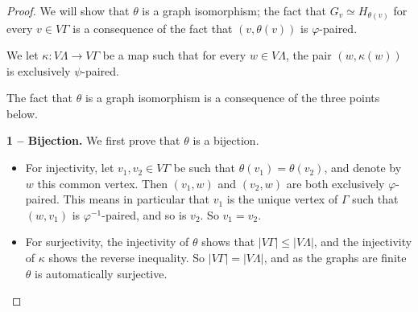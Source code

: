 \documentclass[a4paper,english,11pt]{article}
\theoremstyle{definition}
\theoremstyle{remark}
\begin{document}
\begin{proof}
We will show that $\theta$ is a graph isomorphism; the fact that $G_v\simeq H_{\theta(v)}$ for every $v\in V\Gamma$ is a consequence of the fact that $(v,\theta(v))$ is $\varphi$-paired.

We let $\kappa:V\Lambda\to V\Gamma$ be a map such that for every $w\in V\Lambda$, the pair $(w,\kappa(w))$ is exclusively $\psi$-paired. 

The fact that $\theta$ is a graph isomorphism is a consequence of the three points below. 

\medskip

\textbf{1 – Bijection.}  We first prove that $\theta$ is a bijection. 
\begin{itemize}
\item For injectivity, let $v_1,v_2\in V\Gamma$ be such that $\theta(v_1)=\theta(v_2)$, and denote by $w$ this common vertex. Then $(v_1,w)$ and $(v_2,w)$ are both exclusively $\varphi$-paired. This means in particular that $v_1$ is the unique vertex of $\Gamma$ such that $(w,v_1)$ is $\varphi^{-1}$-paired, and so is $v_2$. So $v_1=v_2$.
\item For surjectivity, the injectivity of $\theta$ shows that $|V\Gamma|\le |V\Lambda|$, and the injectivity of $\kappa$ shows the reverse inequality. So $|V\Gamma|=|V\Lambda|$, and as the graphs are finite $\theta$ is automatically surjective. 
\end{itemize}
\medskip


\end{proof}
\end{document}
